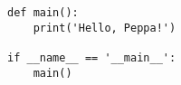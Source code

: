 \begin{verbatim}
def main():
    print('Hello, Peppa!')

if __name__ == '__main__':
    main()
\end{verbatim}